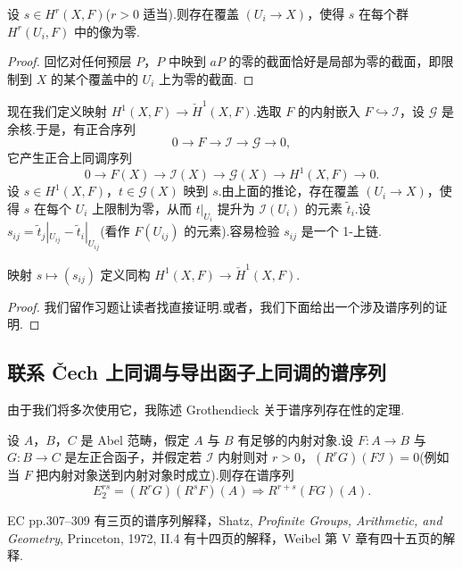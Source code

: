 \begin{corollary}\label{cor:10.5}
设 $s \in H^{r}(X, F)$($r > 0$ 适当).则存在覆盖 $(U_i \to X)$，使得 $s$ 在每个群 $H^{r}(U_i, F)$ 中的像为零.
\end{corollary}

\begin{proof}
回忆对任何预层 $P$，$P$ 中映到 $aP$ 的零的截面恰好是局部为零的截面，即限制到 $X$ 的某个覆盖中的 $U_i$ 上为零的截面.
\end{proof}

现在我们定义映射 $H^{1}(X, F) \to \check{H}^{1}(X, F)$.选取 $F$ 的内射嵌入 $F \hookrightarrow \mathcal{I}$，设 $\mathcal{G}$ 是余核.于是，有正合序列
\[
0 \to F \to \mathcal{I} \to \mathcal{G} \to 0,
\]
它产生正合上同调序列
\[
0 \to F(X) \to \mathcal{I}(X) \to \mathcal{G}(X) \to H^{1}(X, F) \to 0.
\]
设 $s \in H^{1}(X, F)$，$t \in \mathcal{G}(X)$ 映到 $s$.由上面的推论，存在覆盖 $(U_i \to X)$，使得 $s$ 在每个 $U_i$ 上限制为零，从而 $t|_{U_i}$ 提升为 $\mathcal{I}(U_i)$ 的元素 $\tilde{t}_i$.设 $s_{ij} = \tilde{t}_j|_{U_{ij}} - \tilde{t}_i|_{U_{ij}}$(看作 $F(U_{ij})$ 的元素).容易检验 $s_{ij}$ 是一个 1-上链.

\begin{proposition}\label{prop:10.6}
映射 $s \mapsto (s_{ij})$ 定义同构 $H^{1}(X, F) \to \check{H}^{1}(X, F)$.
\end{proposition}

\begin{proof}
我们留作习题让读者找直接证明.或者，我们下面给出一个涉及谱序列的证明.
\end{proof}

\subsection*{联系 \v{C}ech 上同调与导出函子上同调的谱序列}

由于我们将多次使用它，我陈述 Grothendieck 关于谱序列存在性的定理.

\begin{theorem}\label{thm:10.7}
设 $A$，$B$，$C$ 是 Abel 范畴，假定 $A$ 与 $B$ 有足够的内射对象.设 $F \colon A \to B$ 与 $G \colon B \to C$ 是左正合函子，并假定若 $\mathcal{I}$ 内射则对 $r > 0$，$(R^{r}G)(F\mathcal{I}) = 0$(例如当 $F$ 把内射对象送到内射对象时成立).则存在谱序列
\[
E^{rs}_2 = (R^{r}G)(R^{s}F)(A) \Rightarrow R^{r+s}(FG)(A).
\]
\end{theorem}

EC pp.307--309 有三页的谱序列解释，Shatz, \emph{Profinite Groups, Arithmetic, and Geometry}, Princeton, 1972, II.4 有十四页的解释，Weibel 第 V 章有四十五页的解释.

